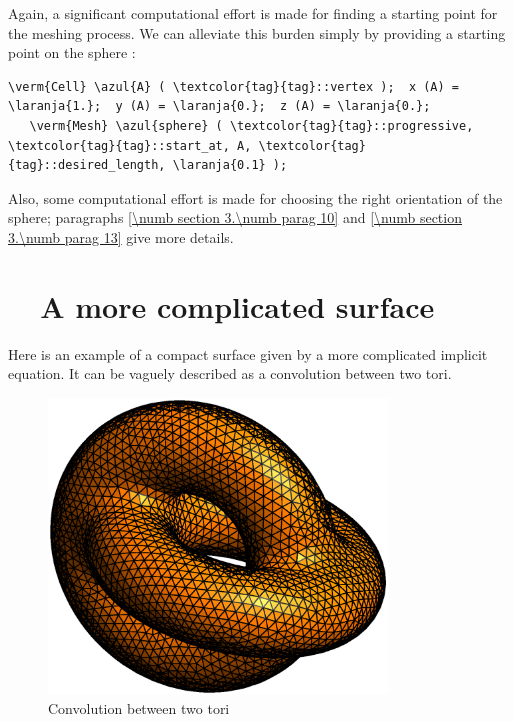 Again, a significant computational effort is made for finding a starting point
for the meshing process.
We can alleviate this burden simply by providing a starting point on the sphere :

\begin{Verbatim}[commandchars=\\\{\},formatcom=\small\tt,
   baselinestretch=0.94,framesep=2mm                     ]
   \verm{Cell} \azul{A} ( \textcolor{tag}{tag}::vertex );  x (A) = \laranja{1.};  y (A) = \laranja{0.};  z (A) = \laranja{0.};
   \verm{Mesh} \azul{sphere} ( \textcolor{tag}{tag}::progressive, \textcolor{tag}{tag}::start_at, A, \textcolor{tag}{tag}::desired_length, \laranja{0.1} );
\end{Verbatim}

Also, some computational effort is made for choosing the right orientation of the sphere;
paragraphs \ref{\numb section 3.\numb parag 10} and \ref{\numb section 3.\numb parag 13}
give more details.


\section{~~A more complicated surface}\label{\numb section 3.\numb parag 7}

Here is an example of a compact surface given by a more complicated implicit equation.
It can be vaguely described as a convolution between two tori.

\begin{figure}[ht] \centering
 \includegraphics[width=90mm]{two-tori}
  \caption{Convolution between two tori}
\end{figure}

